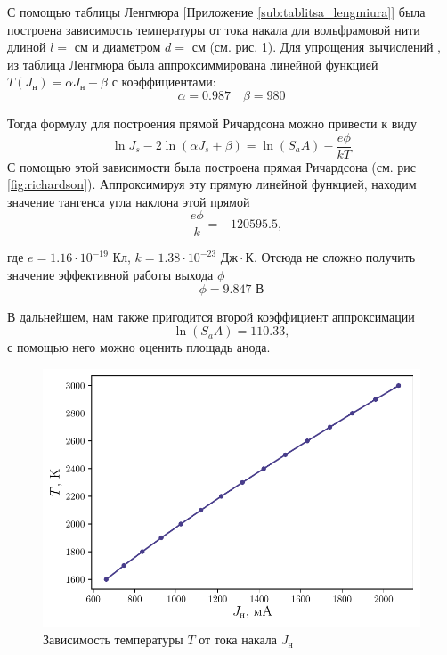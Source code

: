 С помощью таблицы Ленгмюра [Приложение \ref{sub:tablitsa_lengmiura}] была построена
зависимость температуры от тока накала для вольфрамовой нити длиной $l=$ см и
диаметром  $d = $ см (см. рис. \ref{fig:temperature}). Для упрощения вычислений 
, из таблица Ленгмюра была аппроксиммирована линейной функцией $T(J_{\text{н}})
= \alpha J_{\text{н}} + \beta$ с коэффициентами:
\begin{equation}
    \label{eq:approx_lengmur}
    \alpha = 0.987 \quad \beta = 980
\end{equation}

Тогда формулу для построения прямой Ричардсона можно привести к виду
\begin{equation}
    \label{eq:richardson}
    \ln J_s - 2 \ln(\alpha J_s + \beta )= \ln(S_a A) - \frac{e \phi}{k T}
\end{equation}
С помощью этой зависимости
была построена прямая Ричардсона (см. рис \ref{fig:richardson}). Аппроксимируя
эту прямую линейной функцией, находим значение тангенса угла наклона этой
прямой
\begin{equation}
    - \frac{e \phi}{k} = -120595.5,
\end{equation}

где $e= 1.16\cdot 10^{-19}$ Кл, $k = 1.38\cdot 10^{-23} \text{ Дж} \cdot
\text{К}.$
Отсюда не сложно получить значение эффективной работы выхода $\phi$
 \begin{equation}
     \phi = 9.847 \text{ В}
\end{equation}

В дальнейшем, нам также пригодится второй коэффициент аппроксимации
\begin{equation}
    \label{eq:S}
    \ln(S_a A) = 110.33,
\end{equation}
с помощью него можно оценить площадь анода.
\begin{figure}[H]
	\centering
    \includegraphics[width=0.75\linewidth]{scripts/lengmur}
	\caption{Зависимость температуры $T$ от тока накала $J_{\text{н}}$}
	\label{fig:temperature}
\end{figure}

